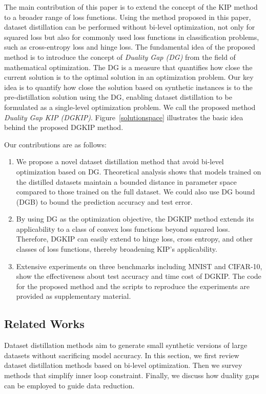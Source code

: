 The main contribution of this paper is to extend the concept of the KIP method to a broader range of loss functions. Using the method proposed in this paper, dataset distillation can be performed without bi-level optimization, not only for squared loss but also for commonly used loss functions in classification problems, such as cross-entropy loss and hinge loss. The fundamental idea of the proposed method is to introduce the concept of \emph{Duality Gap (DG)} from the field of mathematical optimization. The DG is a measure that quantifies how close the current solution is to the optimal solution in an optimization problem. Our key idea is to quantify how close the solution based on synthetic instances is to the pre-distillation solution using the DG, enabling dataset distillation to be formulated as a single-level optimization problem. We call the proposed method \emph{Duality Gap KIP (DGKIP)}. Figure~\ref{solutionspace} illustrates the basic idea behind the proposed DGKIP method.

Our contributions are as follows:
\begin{enumerate} 
\item We propose a novel dataset distillation method that avoid bi-level optimization based on DG. Theoretical analysis shows that models trained on the distilled datasets maintain a bounded distance in parameter space compared to those trained on the full dataset. We could also use DG bound (DGB) to bound the prediction accuracy and test error.  
\item 
By using DG as the optimization objective, the DGKIP method extends its applicability to a class of convex loss functions beyond squared loss. Therefore, DGKIP can easily extend to hinge loss, cross entropy, and other classes of loss functions, thereby broadening KIP’s applicability. 
\item Extensive experiments on three benchmarks including MNIST and CIFAR-10, show the effectiveness about test accuracy and time cost of DGKIP. The code for the proposed method and the scripts to reproduce the experiments are provided as supplementary material.
\end{enumerate}


\subsection{Related Works}
Dataset distillation methods aim to generate small synthetic versions of large datasets without sacrificing model accuracy. In this section, we first review dataset distillation methods based on bi-level optimization. Then we survey methods that simplify inner loop constraint. Finally, we discuss how duality gaps can be employed to guide data reduction.

